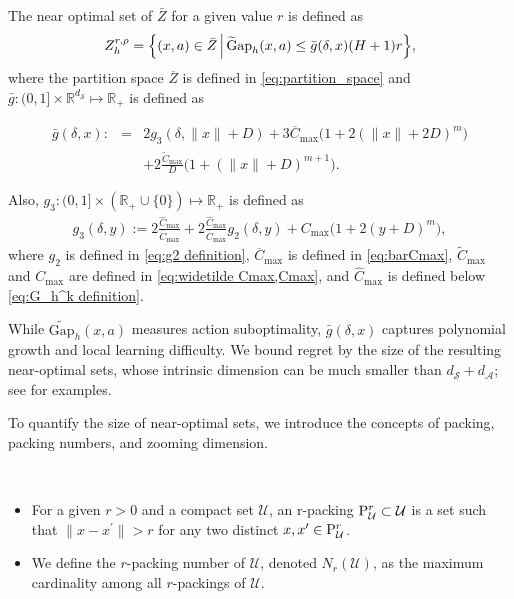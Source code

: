 \documentclass[final,supplement]{siamart251216}
\begin{document}
\begin{definition}\label{def:near optimal set}
 The  near optimal set of $\bar{Z}$ for a given value $r$ is defined as 
\begin{eqnarray}\label{eq:def near optimal set}
      Z_{h}^{r,\rho} = \Big\{(x,a) \in \bar{Z}\,\Big|\, {\rm \widetilde{G}ap}_{h}(x,a) \leq \bar{g}(\delta,x)(H+1)r\Big\},
\end{eqnarray}
where the partition space $\overline{Z}$ is defined in \eqref{eq:partition_space} and $\bar{g}:(0,1]\times \mathbb{R}^{d_{\mathcal{S}}}\mapsto \mathbb{R}_+$ is defined as

\begin{eqnarray} \label{eq: l(x) def}
    \bar{g}(\delta, x):&=& 2g_{3}(\delta,\|x\|+D)+3\overline{C}_{\max}\Big(1+2(\|x\|+2D)^m\Big)
    \\&&+2\frac{\widetilde{C}_{\max}}{D}\Big(1+(\|x\|+D)^{m+1}\Big)\nonumber.
\end{eqnarray}

Also, $g_{3}:(0,1]\times (\mathbb{R}_+\cup\{0\}) \mapsto \mathbb{R}_+$ is defined as
\begin{eqnarray}\label{eq:g3 definition}
    g_{3}(\delta,y):=2\frac{\widehat{C}_{\max}}{\overline{C}_{\max}}+2\frac{\widehat{C}_{\max}}{\overline{C}_{\max}}g_{2}(\delta,y)+C_{\max}\Big(1+2(y+D)^m\Big),
\end{eqnarray} 
where $g_{2}$ is defined in \eqref{eq:g2 definition}, $\overline{C}_{\max}$ is defined in \eqref{eq:barCmax}, $\widetilde{C}_{\max}$ and $C_{\max}$ are defined in \eqref{eq:widetilde Cmax,Cmax}, and $\widehat{C}_{\max}$ is defined below \eqref{eq:G_h^k definition}.
\end{definition}  

While $\widetilde{\mathrm{Gap}}_h(x,a)$ measures action suboptimality,
$\bar g(\delta,x)$ captures polynomial growth and local learning difficulty.
We bound regret by the size of the resulting near-optimal sets, whose
intrinsic dimension can be much smaller than
$d_{\mathcal S}+d_{\mathcal A}$; see \cite{sinclair2023adaptive} for
examples.

To quantify the size of near-optimal sets, we introduce the concepts of packing, packing numbers, and zooming dimension.

\begin{definition}\,\,
\begin{itemize}
    \item For a given $r>0$ and a compact set $\mathcal{U}$, an r-packing ${\rm P}_{\mathcal{U}}^{r} \subset \mathcal{U}$ is a set such that $\|x-x^{\prime}\|>r$ for any two distinct $x,x^{\prime} \in {\rm P}_{\mathcal{U}}^{r}$. 
\item We define the $r$-packing number of $\mathcal{U}$, denoted $N_{r}(\mathcal{U})$, as the maximum cardinality among all $r$-packings of $\mathcal{U}$.
\end{itemize}
\end{definition}
\end{document}
